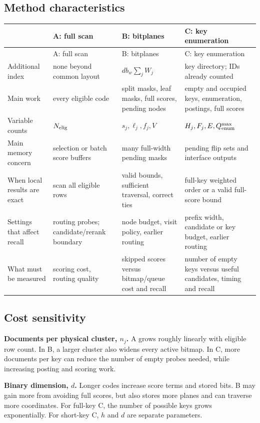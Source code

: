 \subsection{Method characteristics}
\small
\begin{longtable}{@{}P{.16\linewidth}P{.25\linewidth}P{.25\linewidth}P{.25\linewidth}@{}}
\toprule & A: full scan & B: bitplanes & C: key enumeration\\\midrule\endfirsthead
\toprule & A: full scan & B: bitplanes & C: key enumeration\\\midrule\endhead
Additional index & none beyond common layout & $d b_w\sum_jW_j$ & key directory; IDs already counted\\
Main work & every eligible code & split masks, leaf masks, full scores, pending nodes & empty and occupied keys, enumeration, postings, full scores\\
Variable counts & $N_{\mathrm{elig}}$ & $s_j,\ell_j,f_j,V$ & $H_j,F_j,E,Q_{\rm enum}^{\max}$\\
Main memory concern & selection or batch score buffers & many full-width pending masks & pending flip sets and interface outputs\\
When local results are exact & scan all eligible rows & valid bounds, sufficient traversal, correct ties & full-key weighted order or a valid full-score bound\\
Settings that affect recall & routing probes; candidate/rerank boundary & node budget, visit policy, earlier routing & prefix width, candidate or key budget, earlier routing\\
What must be measured & scoring cost, routing quality & skipped scores versus bitmap/queue cost and recall & number of empty keys versus useful candidates, timing and recall\\\bottomrule
\end{longtable}
\normalsize

\subsection{Cost sensitivity}
\textbf{Documents per physical cluster, $n_j$.} A grows roughly linearly with eligible row
count. In B, a larger cluster also widens every active bitmap. In C, more documents per key can
reduce the number of empty probes needed, while increasing posting and scoring work.

\textbf{Binary dimension, $d$.} Longer codes increase score terms and stored bits. B may gain
more from avoiding full scores, but also stores more planes and can traverse more coordinates.
For full-key C, the number of possible keys grows exponentially. For short-key C, $h$ and $d$
are separate parameters.


